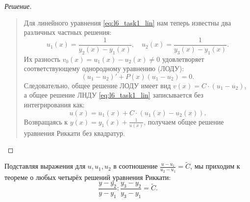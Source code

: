 \begin{proof}[Решение]~\\
    \begin{quote}
        Для линейного уравнения \eqref{eq:l6_task1_lin} нам теперь известны два
        различных частных решения:
        \[
            u_1(x) = \frac{1}{y_2(x) - y_1(x)}, \quad
            u_2(x) = \frac{1}{y_3(x) - y_1(x)}.
        \]
        Их разность $v_0(x) = u_1(x) - u_2(x) \neq 0$ удовлетворяет
        соответствующему однородному уравнению (ЛОДУ):
        \begin{equation} \label{eq:l6_task2_hom}
            (u_1 - u_2)' + P(x) (u_1 - u_2) = 0. \tag{21}
        \end{equation}
        Следовательно, общее решение ЛОДУ имеет вид $v(x) = C \cdot (u_1 - u_2)$,
        а общее решение ЛНДУ \eqref{eq:l6_task1_lin} записывается без
        интегрирования как:
        \[
            u(x) = u_1(x) + C \cdot \left(u_1(x) - u_2(x)\right).
        \]
        Возвращаясь к $y(x) = y_1(x) + \frac{1}{u(x)}$, получаем общее решение
        уравнения Риккати без квадратур.
    \end{quote}
\end{proof}

\begin{remark}
    Подставляя выражения для $u, u_1, u_2$ в соотношение
    $\frac{u - u_1}{u_2 - u_1} = \tilde{C}$, мы приходим к теореме о
     любых четырёх
    решений уравнения Риккати:
    \[
        \frac{y - y_2}{y - y_1} : \frac{y_3 - y_2}{y_3 - y_1} = \tilde{C}.
    \]
\end{remark}